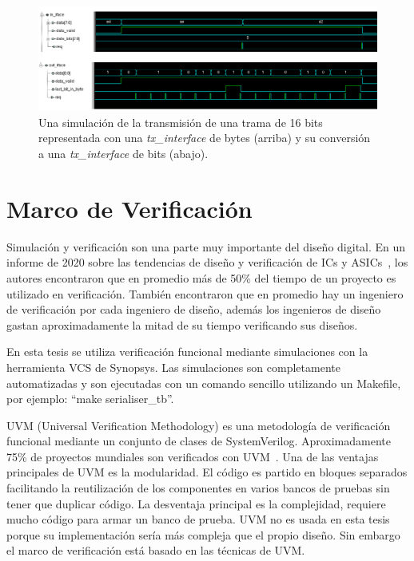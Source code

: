 \documentclass[a4paper, twoside, 11pt]{report}
\begin{document}
\begin{figure}[htb]
  \centering
  \includegraphics[width=1.0\textwidth]{./img/tx_iface_example}
  \caption{Una simulación de la transmisión de una trama de 16 bits representada con una \textit{tx\_interface} de bytes (arriba) y su conversión a una \textit{tx\_interface} de bits (abajo).}
  \label{fig:tx_iface}
\end{figure}


\FloatBarrier
\section{Marco de Verificación}

Simulación y verificación son una parte muy importante del diseño digital. En un informe de 2020 sobre las tendencias de diseño y verificación de ICs y ASICs~\cite{verification_trends_2020}, los autores encontraron que en promedio más de 50\% del tiempo de un proyecto es utilizado en verificación. También encontraron que en promedio hay un ingeniero de verificación por cada ingeniero de diseño, además los ingenieros de diseño gastan aproximadamente la mitad de su tiempo verificando sus diseños.

En esta tesis se utiliza verificación funcional mediante simulaciones con la herramienta VCS de Synopsys. Las simulaciones son completamente automatizadas y son ejecutadas con un comando sencillo utilizando un Makefile, por ejemplo: “make serialiser\_tb”.

UVM (Universal Verification Methodology) es una metodología de verificación funcional mediante un conjunto de clases de SystemVerilog. Aproximadamente 75\% de proyectos mundiales son verificados con UVM~\cite{verification_trends_2020}. Una de las ventajas principales de UVM es la modularidad. El código es partido en bloques separados facilitando la reutilización de los componentes en varios bancos de pruebas sin tener que duplicar código. La desventaja principal es la complejidad, requiere mucho código para armar un banco de prueba. UVM no es usada en esta tesis porque su implementación sería más compleja que el propio diseño. Sin embargo el marco de verificación está basado en las técnicas de UVM.
\end{document}
